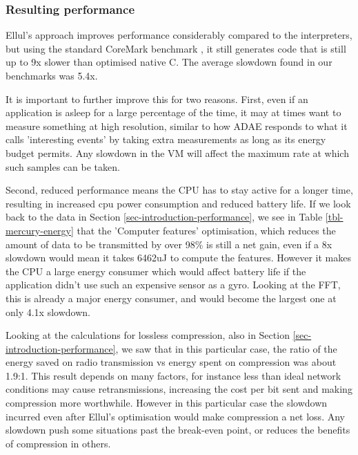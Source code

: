 
\subsubsection{Resulting performance}
Ellul's approach improves performance considerably compared to the interpreters, but using the standard CoreMark benchmark \cite{coremark}, it still generates code that is still up to 9x slower than optimised native C. The average slowdown found in our benchmarks was 5.4x.

It is important to further improve this for two reasons. First, even if an application is asleep for a large percentage of the time, it may at times want to measure something at high resolution, similar to how ADAE \cite{Chang:2010ek} responds to what it calls 'interesting events' by taking extra measurements as long as its energy budget permits. Any slowdown in the VM will affect the maximum rate at which such samples can be taken.

Second, reduced performance means the CPU has to stay active for a longer time, resulting in increased cpu power consumption and reduced battery life. If we look back to the data in Section \ref{sec-introduction-performance}, we see in Table \ref{tbl-mercury-energy} that the 'Computer features' optimisation, which reduces the amount of data to be transmitted by over 98\% is still a net gain, even if a 8x slowdown would mean it takes 6462uJ to compute the features. However it makes the CPU a large energy consumer which would affect battery life if the application didn't use such an expensive sensor as a gyro. Looking at the FFT, this is already a major energy consumer, and would become the largest one at only 4.1x slowdown.

Looking at the calculations for lossless compression, also in Section \ref{sec-introduction-performance}, we saw that in this particular case, the ratio of the energy saved on radio transmission vs energy spent on compression was about 1.9:1. This result depends on many factors, for instance less than ideal network conditions may cause retransmissions, increasing the cost per bit sent and making compression more worthwhile. However in this particular case the slowdown incurred even after Ellul's optimisation would make compression a net loss. Any slowdown push some situations past the break-even point, or reduces the benefits of compression in others.

